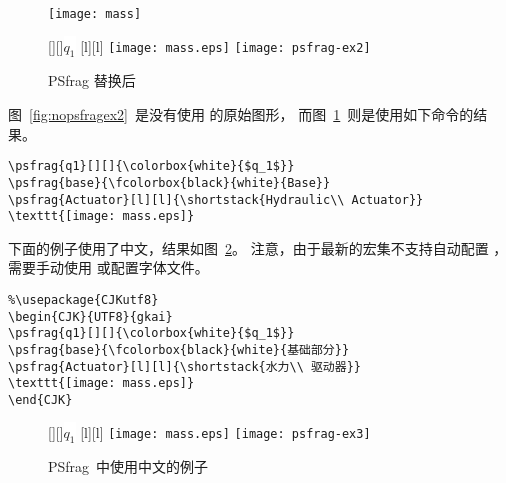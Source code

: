 \begin{figure}
\begin{minipage}[b]{.5\textwidth}
\centering
\texttt{[image: mass]}
\caption{PSfrag 替换前}\label{fig:nopsfragex2}
\par\vspace{0pt}
\end{minipage}%
\begin{minipage}[b]{.5\textwidth}
\centering
\ifdvips
{}[][]{\colorbox{white}{$q_1$}}
[l][l]{}
\texttt{[image: mass.eps]}
\else
\texttt{[image: psfrag-ex2]}
\fi
\caption{PSfrag 替换后}\label{fig:psfragex2}
\par\vspace{0pt}
\end{minipage}
\end{figure}

图~\ref{fig:nopsfragex2}~是没有使用  的原始图形，
而图~\ref{fig:psfragex2}~则是使用如下命令的结果。
\begin{lstlisting}
\psfrag{q1}[][]{\colorbox{white}{$q_1$}}
\psfrag{base}{\fcolorbox{black}{white}{Base}}
\psfrag{Actuator}[l][l]{\shortstack{Hydraulic\\ Actuator}}
\texttt{[image: mass.eps]}
\end{lstlisting}

下面的例子使用了中文，结果如图~\ref{fig:psfragex3}。
注意，由于最新的宏集不支持自动配置 ，
需要手动使用 或配置字体文件。
\begin{lstlisting}
%\usepackage{CJKutf8}
\begin{CJK}{UTF8}{gkai}
\psfrag{q1}[][]{\colorbox{white}{$q_1$}}
\psfrag{base}{\fcolorbox{black}{white}{基础部分}}
\psfrag{Actuator}[l][l]{\shortstack{水力\\ 驱动器}}
\texttt{[image: mass.eps]}
\end{CJK}
\end{lstlisting}

\begin{figure}
\centering
\ifdvips
{}[][]{\colorbox{white}{$q_1$}}
[l][l]{}
\texttt{[image: mass.eps]}
\else
\texttt{[image: psfrag-ex3]}
\fi
\caption{PSfrag~{中使用中文的例子}}\label{fig:psfragex3}
\end{figure}


